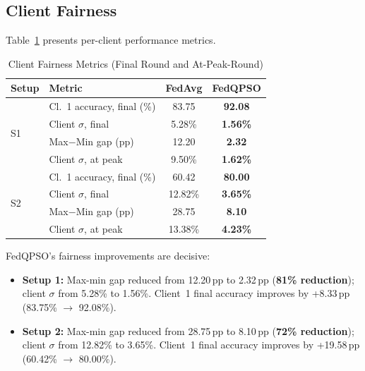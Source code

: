 \documentclass[conference]{IEEEtran}
\begin{document}
\subsection{Client Fairness}
\label{sec:fairness}

Table~\ref{tab:fairness} presents per-client performance metrics.

\begin{table}[htbp]
\caption{Client Fairness Metrics (Final Round and At-Peak-Round)}
\label{tab:fairness}
\begin{center}
\renewcommand{\arraystretch}{1.15}
\begin{tabular}{llcc}
\hline
\textbf{Setup} & \textbf{Metric} & \textbf{FedAvg} & \textbf{FedQPSO}\\
\hline
\multirow{4}{*}{S1}
 & Cl.\ 1 accuracy, final (\%)  & 83.75 & \textbf{92.08}\\
 & Client $\sigma$, final        & 5.28\% & \textbf{1.56\%}\\
 & Max$-$Min gap (pp)            & 12.20 & \textbf{2.32}\\
 & Client $\sigma$, at peak      & 9.50\% & \textbf{1.62\%}\\
\hline
\multirow{4}{*}{S2}
 & Cl.\ 1 accuracy, final (\%)  & 60.42 & \textbf{80.00}\\
 & Client $\sigma$, final        & 12.82\% & \textbf{3.65\%}\\
 & Max$-$Min gap (pp)            & 28.75 & \textbf{8.10}\\
 & Client $\sigma$, at peak      & 13.38\% & \textbf{4.23\%}\\
\hline
\end{tabular}
\end{center}
\end{table}



FedQPSO's fairness improvements are decisive:
\begin{itemize}
    \item \textbf{Setup 1:} Max-min gap reduced from 12.20\,pp to 2.32\,pp
    (\textbf{81\% reduction}); client $\sigma$ from 5.28\% to 1.56\%.
    Client~1 final accuracy improves by +8.33\,pp (83.75\% $\to$ 92.08\%).

    \item \textbf{Setup 2:} Max-min gap reduced from 28.75\,pp to 8.10\,pp
    (\textbf{72\% reduction}); client $\sigma$ from 12.82\% to 3.65\%.
    Client~1 final accuracy improves by +19.58\,pp (60.42\% $\to$ 80.00\%).
\end{itemize}
\end{document}
